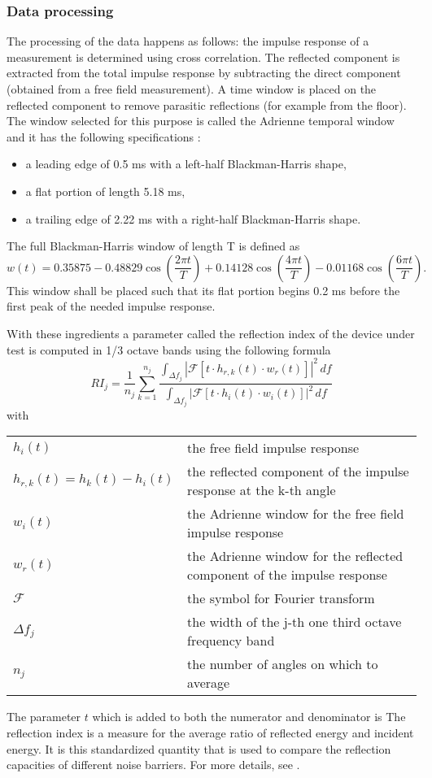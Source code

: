 \subsubsection{Data processing}\label{adrwindow}
The processing of the data happens as follows: the impulse response of a measurement is determined using cross correlation. The reflected component is extracted from the total impulse response by subtracting the direct component (obtained from a free field measurement). A time window is placed on the reflected component to remove parasitic reflections (for example from the floor). The window selected for this purpose is called the Adrienne temporal window and it has the following specifications \cite{Adrienne}:
\vspace{-20pt}
\begin{itemize}
	\setlength{\itemsep}{1pt}
  \setlength{\parskip}{0pt}
  \setlength{\parsep}{0pt}
	\item a leading edge of 0.5 ms with a left-half Blackman-Harris shape,
	\item a flat portion of length 5.18 ms,
	\item a trailing edge of 2.22 ms with a right-half Blackman-Harris shape.
\end{itemize}
\vspace{-20pt}
The full Blackman-Harris window of length T is defined as 
\[
w(t) = 0.35875 - 0.48829 \cos(\frac{2 \pi t}{T}) + 0.14128 \cos(\frac{4 \pi t}{T}) - 0.01168 \cos(\frac{6 \pi t}{T}).
\]
This window shall be placed such that its flat portion begins 0.2 ms before the first peak of the needed impulse response.

With these ingredients a parameter called the reflection index of the device under test is computed in 1/3 octave bands using the following formula 
\[
RI_j = \frac{1}{n_j} \sum^{n_j}_{k=1} \frac{\int_{\Delta f_j} \left|\mathcal{F}\left[t\cdot h_{r,k}(t)\cdot w_r(t)\right]\right|^2 \,df }{\int_{\Delta f_j} \left|\mathcal{F}\left[t \cdot h_{i}(t) \cdot w_i(t)\right]\right|^2 \,df }
\]
with \\

\begin{tabular}{ll}
$h_i(t)$ & the free field impulse response \\
$h_{r,k}(t) = h_k(t) - h_i(t)$ & the reflected component of the impulse response at the k-th angle \\
$w_i(t)$ & the Adrienne window for the free field impulse response\\ 
$w_r(t)$ & the Adrienne window for the reflected component of the impulse response\\ 
$\mathcal{F}$ & the symbol for Fourier transform \\
$\Delta f_j$ & the width of the j-th one third octave frequency band\\
$n_j$ & the number of angles on which to average\\ 
\end{tabular}
The parameter $t$ which is added to both the numerator and denominator is 
The reflection index is a measure for the average ratio of reflected energy and incident energy. It is this standardized quantity that is used to compare the reflection capacities of different noise barriers. For more details, see \cite{Adrienne}.


